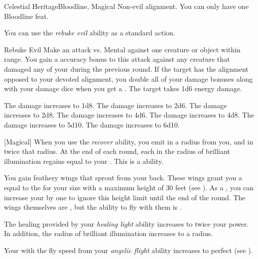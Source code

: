     \begin{feat}{Celestial Heritage}{Bloodline, Magical}
        \featpre Non-evil alignment.
         You can only have one Bloodline feat.

         You can use the \textit{rebuke evil} ability as a standard action.
        \begin{activeability}{Rebuke Evil}
            \rankline
            Make an attack vs. Mental against one creature or object within \rngmed range.
            You gain a  accuracy bonus to this attack against any creature that damaged any of your  during the previous round.
            If the target has the alignment opposed to your devoted alignment, you double all of your damage bonuses along with your damage dice when you get a .
            \hit The target takes 1d6 \add {} energy damage.

            \rankline
             The damage increases to 1d8.
             The damage increases to 2d6.
             The damage increases to 2d8.
             The damage increases to 4d6.
             The damage increases to 4d8.
             The damage increases to 5d10.
             The damage increases to 6d10.
        \end{activeability}

        [Magical] When you use the \textit{recover} ability, you  emit  in a \medarea radius  from you, and  in twice that radius.
        At the end of each round, each  in the radius of brilliant illumination regains  equal to your .
        This is a  ability.

         You gain feathery wings that sprout from your back.
        These wings grant you a  equal to the  for your size with a maximum height of 30 feet (see ).
        As a , you can increase your  by one to ignore this height limit until the end of the round.
        The wings themselves are , but the ability to fly with them is .

         The healing provided by your \textit{healing light} ability increases to twice your power.
        In addition, the radius of brilliant illumination increases to a \hugearea radius.

         Your  with the fly speed from your \textit{angelic flight} ability increases to perfect (see ).
    \end{feat}

